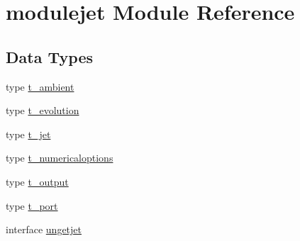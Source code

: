 \hypertarget{namespacemodulejet}{}\section{modulejet Module Reference}
\label{namespacemodulejet}
\subsection*{Data Types}
\begin{DoxyCompactItemize}
\item 
type \mbox{\hyperlink{structmodulejet_1_1t__ambient}{t\+\_\+ambient}}
\item 
type \mbox{\hyperlink{structmodulejet_1_1t__evolution}{t\+\_\+evolution}}
\item 
type \mbox{\hyperlink{structmodulejet_1_1t__jet}{t\+\_\+jet}}
\item 
type \mbox{\hyperlink{structmodulejet_1_1t__numericaloptions}{t\+\_\+numericaloptions}}
\item 
type \mbox{\hyperlink{structmodulejet_1_1t__output}{t\+\_\+output}}
\item 
type \mbox{\hyperlink{structmodulejet_1_1t__port}{t\+\_\+port}}
\item 
interface \mbox{\hyperlink{interfacemodulejet_1_1ungetjet}{ungetjet}}
\end{DoxyCompactItemize}
